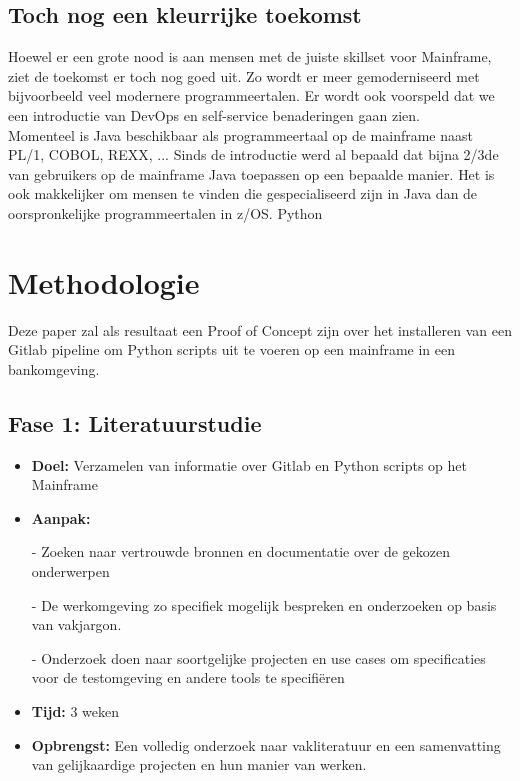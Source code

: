 \subsection{Toch nog een kleurrijke toekomst}
Hoewel er een grote nood is aan mensen met de juiste skillset voor Mainframe, ziet de toekomst er toch nog goed uit. Zo wordt er meer gemoderniseerd met bijvoorbeeld veel modernere programmeertalen. Er wordt ook voorspeld dat we een introductie van DevOps en self-service benaderingen gaan zien. \autocite{Pennaz2023} \\
Momenteel is Java beschikbaar als programmeertaal op de mainframe naast PL/1, COBOL, REXX, ...
Sinds de introductie werd al bepaald dat bijna 2/3de van gebruikers op de mainframe Java toepassen op een bepaalde manier. \autocite{Watts2018}
Het is ook makkelijker om mensen te vinden die gespecialiseerd zijn in Java dan de oorspronkelijke programmeertalen in z/OS. 
Python 



\section{Methodologie}%
\label{sec:methodologie}
Deze paper zal als resultaat een Proof of Concept zijn over het installeren van een Gitlab pipeline om Python scripts uit te voeren op een mainframe in een bankomgeving. 

\subsection{Fase 1: Literatuurstudie}
\begin{itemize}
    \item \textbf{Doel:}
          Verzamelen van informatie over Gitlab en Python scripts op het Mainframe
    \item \textbf{Aanpak:}
          \item[-] Zoeken naar vertrouwde bronnen en documentatie over de gekozen onderwerpen
          \item[-] De werkomgeving zo specifiek mogelijk bespreken en onderzoeken op basis van vakjargon.
          \item[-] Onderzoek doen naar soortgelijke projecten en use cases om specificaties voor de testomgeving en andere tools te specifiëren
          
     \item \textbf{Tijd:} 3 weken
     \item \textbf{Opbrengst:}
           Een volledig onderzoek naar vakliteratuur en een samenvatting van gelijkaardige projecten en hun manier van werken.  
\end{itemize}


